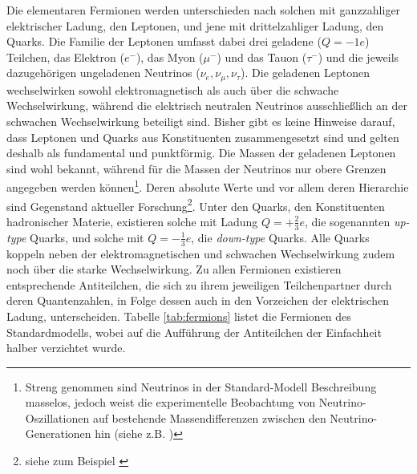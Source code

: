 Die elementaren Fermionen werden unterschieden nach solchen mit ganzzahliger
elektrischer Ladung, den Leptonen, und jene mit drittelzahliger Ladung, den
Quarks. Die Familie der Leptonen umfasst dabei drei geladene ($Q=-1e$)
Teilchen, das Elektron ($e^-$), das Myon ($\mu^-$) und das Tauon ($\tau^-$) und
die jeweils dazugehörigen ungeladenen Neutrinos ($\nu_e,\nu_\mu,\nu_\tau$). Die
geladenen Leptonen wechselwirken sowohl elektromagnetisch als auch über die
schwache Wechselwirkung, während die elektrisch neutralen Neutrinos
ausschließlich an der schwachen Wechselwirkung beteiligt sind. Bisher gibt es
keine Hinweise darauf, dass Leptonen und Quarks aus Konstituenten
zusammengesetzt sind und gelten deshalb als fundamental und punktförmig. Die
Massen der geladenen Leptonen sind wohl bekannt, während für die Massen der
Neutrinos nur obere Grenzen angegeben werden können\footnote{Streng genommen
sind Neutrinos in der Standard-Modell Beschreibung masselos, jedoch weist die
experimentelle Beobachtung von Neutrino-Oszillationen auf bestehende
Massendifferenzen zwischen den Neutrino-Generationen hin (siehe z.B.
\cite{Ahn:2006zza})}. Deren absolute Werte und vor allem deren Hierarchie sind
Gegenstand aktueller Forschung\footnote{siehe zum Beispiel
\cite{Winter:2013ema}}. Unter den Quarks, den Konstituenten hadronischer
Materie, existieren solche mit Ladung $Q=+\tfrac{2}{3}e$, die sogenannten
\textit{up-type} Quarks, und solche mit $Q=-\tfrac{1}{3}e$, die
\textit{down-type} Quarks. Alle Quarks koppeln neben der elektromagnetischen
und schwachen Wechselwirkung zudem noch über die starke Wechselwirkung.
Zu allen Fermionen existieren entsprechende Antiteilchen, die sich zu ihrem
jeweiligen Teilchenpartner durch deren Quantenzahlen, in Folge dessen auch in
den Vorzeichen der elektrischen Ladung, unterscheiden. Tabelle
\ref{tab:fermions} listet die Fermionen des Standardmodells, wobei auf die
Aufführung der Antiteilchen der Einfachheit halber verzichtet wurde.

